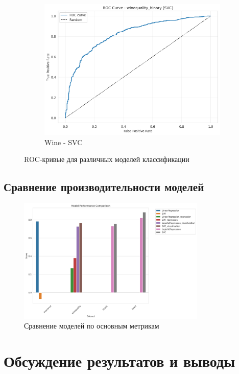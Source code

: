 \documentclass[a4paper]{article}
\begin{document}
\begin{figure}[H]
\hfill
\begin{subfigure}{0.3\textwidth}
    \includegraphics[width=\textwidth]{images/roc_curve_winequality_binary_svc.png}
    \caption{Wine - SVC}
\end{subfigure}
\caption{ROC-кривые для различных моделей классификации}
\end{figure}

\subsection{Сравнение производительности моделей}

\begin{figure}[H]
\centering
\includegraphics[width=0.8\textwidth]{images/model_comparison.png}
\caption{Сравнение моделей по основным метрикам}
\end{figure}

\section{Обсуждение результатов и выводы}
\end{document}
